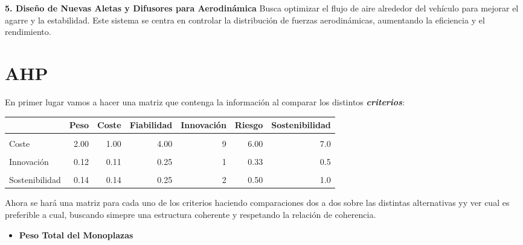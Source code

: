 \documentclass[
]{article}
\providecommand{\tightlist}{%
  \setlength{\itemsep}{0pt}\setlength{\parskip}{0pt}}
\begin{document}
\textbf{5. Diseño de Nuevas Aletas y Difusores para Aerodinámica} Busca
optimizar el flujo de aire alrededor del vehículo para mejorar el agarre
y la estabilidad. Este sistema se centra en controlar la distribución de
fuerzas aerodinámicas, aumentando la eficiencia y el rendimiento.

\newpage

\section{AHP}\label{ahp}

En primer lugar vamos a hacer una matriz que contenga la información al
comparar los distintos \textbf{\emph{criterios}}:

\begin{longtable}[t]{lrrrrrr}
\toprule
 & Peso & Coste & Fiabilidad & Innovación & Riesgo & Sostenibilidad\\
\midrule
\cellcolor{gray!10}{Peso} & \cellcolor{gray!10}{1.00} & \cellcolor{gray!10}{0.50} & \cellcolor{gray!10}{3.00} & \cellcolor{gray!10}{8} & \cellcolor{gray!10}{5.00} & \cellcolor{gray!10}{7.0}\\
Coste & 2.00 & 1.00 & 4.00 & 9 & 6.00 & 7.0\\
\cellcolor{gray!10}{Fiabilidad} & \cellcolor{gray!10}{0.33} & \cellcolor{gray!10}{0.25} & \cellcolor{gray!10}{1.00} & \cellcolor{gray!10}{4} & \cellcolor{gray!10}{2.00} & \cellcolor{gray!10}{4.0}\\
Innovación & 0.12 & 0.11 & 0.25 & 1 & 0.33 & 0.5\\
\cellcolor{gray!10}{Riesgo} & \cellcolor{gray!10}{0.20} & \cellcolor{gray!10}{0.17} & \cellcolor{gray!10}{0.50} & \cellcolor{gray!10}{3} & \cellcolor{gray!10}{1.00} & \cellcolor{gray!10}{2.0}\\
\addlinespace
Sostenibilidad & 0.14 & 0.14 & 0.25 & 2 & 0.50 & 1.0\\
\bottomrule
\end{longtable}

Ahora se hará una matriz para cada uno de los criterios haciendo
comparaciones dos a dos sobre las distintas alternativas yy ver cual es
preferible a cual, buscando simepre una estructura coherente y
respetando la relación de coherencia.

\begin{itemize}
\tightlist
\item
  \textbf{Peso Total del Monoplazas}
\end{itemize}
\end{document}
